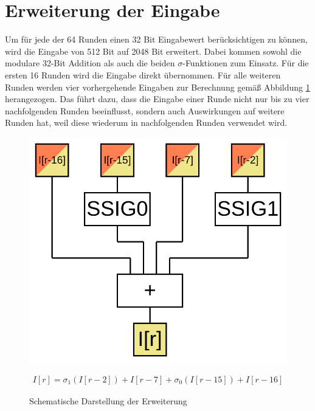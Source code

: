 \section{Erweiterung der Eingabe}
\label{sec:sha256:erweiterung}

Um für jede der 64 Runden einen 32 Bit Eingabewert berücksichtigen zu können, wird die Eingabe von 512 Bit auf 2048 Bit erweitert.
Dabei kommen sowohl die modulare 32-Bit Addition als auch die beiden $\sigma$-Funktionen zum Einsatz.
Für die ersten 16 Runden wird die Eingabe direkt übernommen. Für alle weiteren Runden werden vier vorhergehende Eingaben zur Berechnung
gemäß Abbildung \ref{fig:sha256prep} herangezogen. Das führt dazu, dass die Eingabe einer Runde nicht nur bis zu vier nachfolgenden
Runden beeinflusst, sondern auch Auswirkungen auf weitere Runden hat, weil diese wiederum in nachfolgenden Runden verwendet wird.

\begin{figure}[!h]
  \centering
  \begin{minipage}[c]{5cm}
    \includegraphics[scale=0.4]{images/sha256prepS}
  \end{minipage}
  \begin{minipage}[c]{6cm}
    \begin{align}
      I[r] = \sigma_1(I[r-2]) + I[r-7] + \sigma_0(I[r-15]) + I[r-16] \nonumber
    \end{align}
  \end{minipage}
  \caption{Schematische Darstellung der Erweiterung}
  \label{fig:sha256prep}
\end{figure}